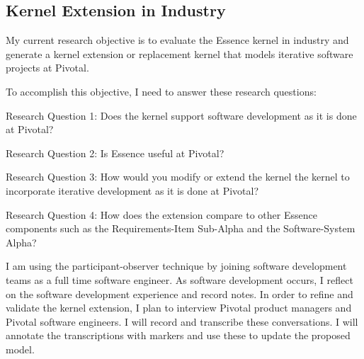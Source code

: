 \documentclass[preprint,12pt,3p]{elsarticle}
\begin{document}

\subsection{Kernel Extension in Industry}
\label{PivotalKernelExtension}
My current research objective is to evaluate the Essence kernel in industry and generate a kernel extension or replacement kernel that models iterative software projects at Pivotal.

To accomplish this objective, I need to answer these research questions:

Research Question 1: Does the kernel support software development as it is done at Pivotal? 

Research Question 2: Is Essence useful at Pivotal?

Research Question 3: How would you modify or extend the kernel the kernel to incorporate iterative development as it is done at Pivotal?

Research Question 4: How does the extension compare to other Essence components such as the Requirements-Item Sub-Alpha and the Software-System Alpha? 

I am using the participant-observer technique by joining software development teams as a full time software engineer. As software development occurs, I reflect on the software development experience and record notes.  In order to refine and validate the kernel extension, I plan to interview Pivotal product managers and Pivotal software engineers. I will record and transcribe these conversations. I will annotate the transcriptions with markers and use these to update the proposed model.
\end{document}
